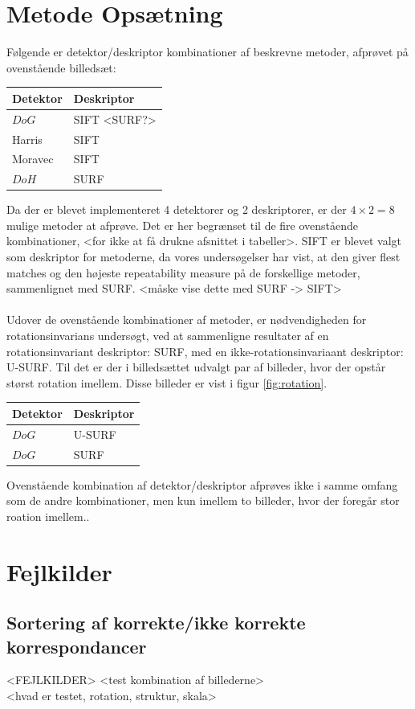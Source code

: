 \section{Metode Opsætning}
Følgende er detektor/deskriptor kombinationer af beskrevne metoder, afprøvet på ovenstående billedsæt:
\begin{center}
    \begin{tabular}{ | l | l |}
    \hline
    Detektor & Deskriptor \\ \hline
    $DoG$ & SIFT <SURF?>  \\ \hline       
    Harris & SIFT \\ \hline    
    Moravec & SIFT \\ \hline    
    $DoH$ & SURF\\ \hline    
    \end{tabular}
\end{center}
Da der er blevet implementeret 4 detektorer og 2 deskriptorer, er der $4\times 2=8$ mulige metoder at afprøve. Det er her begrænset til de fire ovenstående kombinationer, <for ikke at få drukne afsnittet i tabeller>. SIFT er blevet valgt som deskriptor for metoderne, da vores undersøgelser har vist, at den giver flest matches og den højeste repeatability measure på de forskellige metoder, sammenlignet med SURF. <måske vise dette med SURF -> SIFT>
\\ \\ 
Udover de ovenstående kombinationer af metoder, er nødvendigheden for rotationsinvarians undersøgt, ved at sammenligne resultater af en rotationsinvariant deskriptor: SURF, med en ikke-rotationsinvariaant deskriptor: U-SURF. Til det er der i billedsættet udvalgt par af billeder, hvor der opstår størst rotation imellem. Disse billeder er vist i figur \ref{fig:rotation}.
\begin{center}
    \begin{tabular}{ | l | l |}
    \hline
    Detektor & Deskriptor \\ \hline
    $DoG$ & U-SURF \\ \hline       
    $DoG$ & SURF \\ \hline     
    \end{tabular}
\end{center}
Ovenstående kombination af detektor/deskriptor afprøves ikke i samme omfang som de andre kombinationer, men kun imellem to billeder, hvor der foregår stor roation imellem..
\section{Fejlkilder}
\subsection{Sortering af korrekte/ikke korrekte korrespondancer}

<FEJLKILDER>
<test kombination af billederne> \\
<hvad er testet, rotation, struktur, skala>